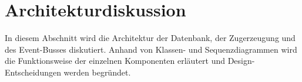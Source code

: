 \section{Architekturdiskussion}

In diesem Abschnitt wird die Architektur der Datenbank, der Zugerzeugung und des Event-Busses diskutiert. Anhand von Klassen- und Sequenzdiagrammen wird die Funktionsweise der einzelnen Komponenten erläutert und Design-Entscheidungen werden begründet.





